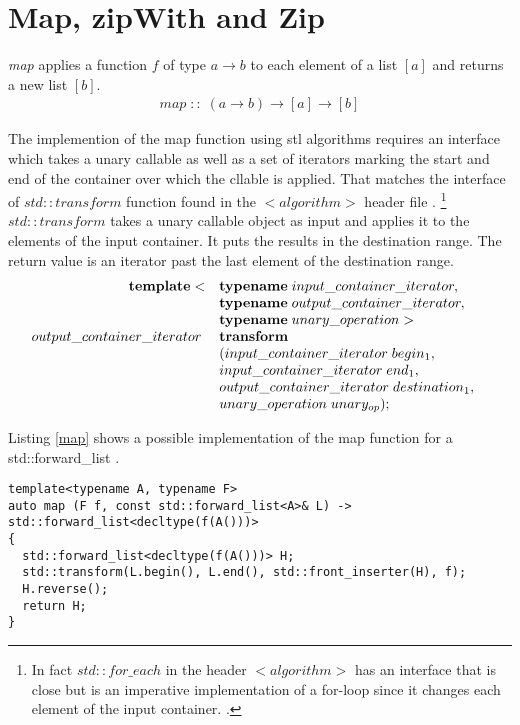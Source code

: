\documentclass[12pt,fleqn]{article}
\begin{document}
\section*{Map, zipWith and Zip}
%
%
{\em map} applies a function $f$ of type $a \rightarrow b$ to each element of a list $[a]$ and returns a new list $[b]$. 
\begin{eqnarray*}
map \;::\; (a \rightarrow b) \rightarrow [a] \rightarrow [b]
\end{eqnarray*}

The implemention of the map function using stl algorithms requires an interface which takes a unary callable as well as a set of iterators marking the start and end of the container over which the cllable is applied.
That matches the interface of $std::transform$ function found in the $<algorithm>$ header file \cite{josuttis, std::transform}.
%
\footnote {
In fact $std::for\_each$ in the header $<algorithm>$ has an interface that is close but is an imperative implementation of a for-loop 
since it changes each element of the input container.
\cite{std::foreach, josuttis}.
}
$std::transform$ takes a unary callable object as input and applies it to the elements of the input container.
It puts the results in the destination range. 
The return value is an iterator past the last element of the destination range. 
\[
\begin{array}{rll}
\mbox{\bf template}<&\mbox{\bf typename}\; input\_container\_iterator, \\
               &\mbox{\bf typename} \; output \_container\_iterator, \\
             &\mbox{\bf typename} \; unary\_operation >&\\
output\_container\_iterator\;& \mbox{\bf transform}\\
&( input\_container\_iterator\; begin_1, \\
& input\_container\_iterator \; end_1, \\
& output\_container\_iterator \; destination_1, \\
& unary\_operation \; unary_{op} );
\end{array}
\]

Listing \ref{map} shows a possible implementation of the map function for a std::forward\_list \cite{std::forward_list, josuttis}.

\begin{lstlisting}[caption=map for std::forward\_list,label=map]
template<typename A, typename F>
auto map (F f, const std::forward_list<A>& L) -> std::forward_list<decltype(f(A()))>
{
  std::forward_list<decltype(f(A()))> H;
  std::transform(L.begin(), L.end(), std::front_inserter(H), f);
  H.reverse();
  return H;
}
\end{lstlisting}
\end{document}
